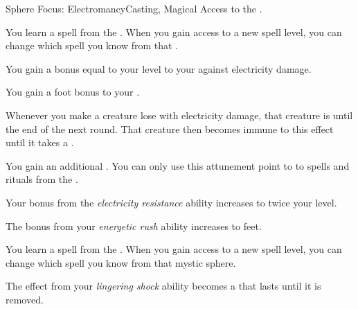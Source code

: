     \begin{feat}{Sphere Focus: Electromancy}{Casting, Magical}
        \featpre Access to the  .

         You learn a spell from the  .
        When you gain access to a new spell level, you can change which spell you know from that .

         You gain a bonus equal to your level to your  against electricity damage.

         You gain a  foot bonus to your .

         Whenever you make a creature lose  with electricity damage, that creature is \dazed until the end of the next round.
        That creature then becomes immune to this effect until it takes a .

         You gain an additional .
        You can only use this attunement point to  to spells and rituals from the  .

         Your bonus from the \textit{electricity resistance} ability increases to twice your level.

         The bonus from your \textit{energetic rush} ability increases to  feet.

         You learn a spell from the  .
        When you gain access to a new spell level, you can change which spell you know from that mystic sphere.

         The \dazed effect from your \textit{lingering shock} ability becomes a  that lasts until it is removed.
    \end{feat}

